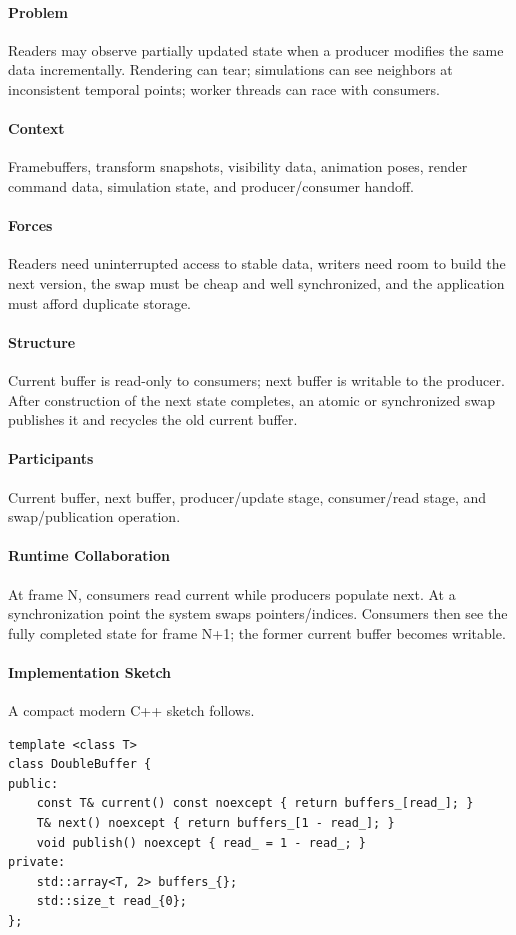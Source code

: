 \documentclass[11pt]{article}
\begin{document}
\paragraph{Problem} Readers may observe partially updated state when a producer modifies the same data incrementally. Rendering can tear; simulations can see neighbors at inconsistent temporal points; worker threads can race with consumers.
\paragraph{Context} Framebuffers, transform snapshots, visibility data, animation poses, render command data, simulation state, and producer/consumer handoff.
\paragraph{Forces} Readers need uninterrupted access to stable data, writers need room to build the next version, the swap must be cheap and well synchronized, and the application must afford duplicate storage.
\paragraph{Structure} Current buffer is read-only to consumers; next buffer is writable to the producer. After construction of the next state completes, an atomic or synchronized swap publishes it and recycles the old current buffer.
\paragraph{Participants} Current buffer, next buffer, producer/update stage, consumer/read stage, and swap/publication operation.
\paragraph{Runtime Collaboration} At frame N, consumers read current while producers populate next. At a synchronization point the system swaps pointers/indices. Consumers then see the fully completed state for frame N+1; the former current buffer becomes writable.
\paragraph{Implementation Sketch} A compact modern C++ sketch follows.
\begin{lstlisting}
template <class T>
class DoubleBuffer {
public:
    const T& current() const noexcept { return buffers_[read_]; }
    T& next() noexcept { return buffers_[1 - read_]; }
    void publish() noexcept { read_ = 1 - read_; }
private:
    std::array<T, 2> buffers_{};
    std::size_t read_{0};
};
\end{lstlisting}
\end{document}
